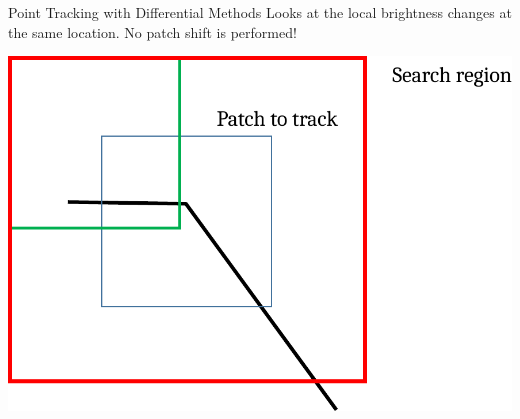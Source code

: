 \begin{frame}{Point Tracking with Differential Methods}
  Looks at the local brightness changes at the same location. No patch shift is performed!
  
  \begin{center}
    \includegraphics[width=0.3\columnwidth]{./images/optical_flow/point_tracking_block_matching_3.pdf}
  \end{center}
\end{frame}

